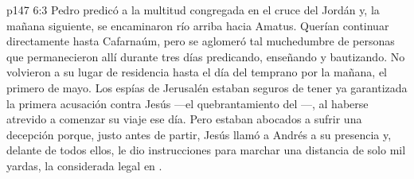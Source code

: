 \vs p147 6:3 \pc Pedro predicó a la multitud congregada en el cruce del Jordán y, la mañana siguiente, se encaminaron río arriba hacia Amatus. Querían continuar directamente hasta Cafarnaúm, pero se aglomeró tal muchedumbre de personas que permanecieron allí durante tres días predicando, enseñando y bautizando. No volvieron a su lugar de residencia hasta el día del  temprano por la mañana, el primero de mayo. Los espías de Jerusalén estaban seguros de tener ya garantizada la primera acusación contra Jesús ---el quebrantamiento del ---, al haberse atrevido a comenzar su viaje ese día. Pero estaban abocados a sufrir una decepción porque, justo antes de partir, Jesús llamó a Andrés a su presencia y, delante de todos ellos, le dio instrucciones para marchar una distancia de solo mil yardas, la considerada legal en .
